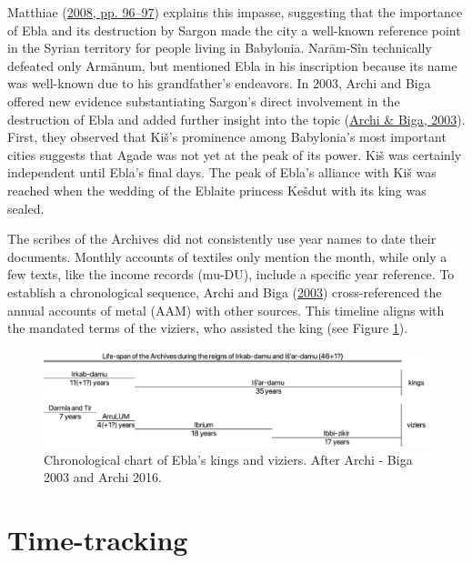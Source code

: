 \documentclass[
]{book}
\begin{document}
Matthiae (\protect\hyperlink{ref-Matthiae2008a}{2008, pp. 96--97}) explains this impasse, suggesting that the importance of Ebla and its destruction by Sargon made the city a well-known reference point in the Syrian territory for people living in Babylonia. Narām-Sîn technically defeated only Armānum, but mentioned Ebla in his inscription because its name was well-known due to his grandfather's endeavors. In 2003, Archi and Biga offered new evidence substantiating Sargon's direct involvement in the destruction of Ebla and added further insight into the topic (\protect\hyperlink{ref-ArchiBiga2003}{Archi \& Biga, 2003}). First, they observed that Kiš's prominence among Babylonia's most important cities suggests that Agade was not yet at the peak of its power. Kiš was certainly independent until Ebla's final days. The peak of Ebla's alliance with Kiš was reached when the wedding of the Eblaite princess Kešdut with its king was sealed.

The scribes of the Archives did not consistently use year names to date their documents. Monthly accounts of textiles only mention the month, while only a few texts, like the income records (mu-DU), include a specific year reference. To establish a chronological sequence, Archi and Biga (\protect\hyperlink{ref-ArchiBiga2003}{2003}) cross-referenced the annual accounts of metal (AAM) with other sources. This timeline aligns with the mandated terms of the viziers, who assisted the king (see Figure \ref{fig:chronology}).

\begin{figure}

{\centering \includegraphics[width=1\linewidth]{./assets/Chronology} 

}

\caption{Chronological chart of Ebla’s kings and viziers. After Archi - Biga 2003 and Archi 2016.}\label{fig:chronology}
\end{figure}

\hypertarget{time-tracking}{%
\section{Time-tracking}\label{time-tracking}}
\end{document}
